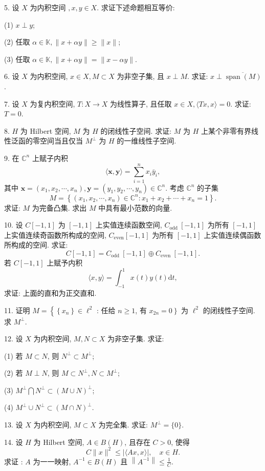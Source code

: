 \documentclass[openany]{ctexbook}
\theoremstyle{kaiti}
\theoremstyle{normal}
\begin{document}
5. 设 $X$ 为内积空间 $, x, y \in X$. 求证下述命题相互等价:

(1) $x \perp y$;

(2) 任取 $\alpha \in \mathbb{K},\|x+\alpha y\| \geqslant\|x\|$;

(3) 任取 $\alpha \in \mathbb{K},\|x+\alpha y\|=\|x-\alpha y\|$.

6. 设 $X$ 为内积空间, $x \in X, M \subset X$ 为非空子集, 且 $x \perp M$. 求证: $x \perp \overline{\operatorname{span}(M)}$.

7. 设 $X$ 为复内积空间, $T: X \rightarrow X$ 为线性算子, 且任取 $x \in X,\langle T x, x\rangle=0$. 求证: $T=0$.

8. $H$ 为 Hilbert 空间, $M$ 为 $H$ 的闭线性子空间. 求证: $M$ 为 $H$ 上某个非零有界线性泛函的零空间当且仅当 $M^{\perp}$ 为 $H$ 的一维线性子空间.

9. 在 $\mathbb{C}^n$ 上赋子内积
$$
\langle\boldsymbol{x}, \boldsymbol{y}\rangle=\sum_{i=1}^n x_{i} \bar{y}_{i},
$$
其中 $\boldsymbol{x}=\left(x_1, x_2, \cdots, x_n\right), \boldsymbol{y}=\left(y_1, y_2, \cdots, y_n\right) \in \mathbb{C}^n$. 考虑 $\mathbb{C}^n$ 的子集
$$
M=\left\{\left(x_1, x_2, \cdots, x_n\right) \in \mathbb{C}^n: x_1+x_2+\cdots+x_n=1\right\}.
$$
求证: $M$ 为完备凸集. 求出 $M$ 中具有最小范数的向量.

10. 设 $C[-1,1]$ 为 $[-1,1]$ 上实值连续函数空间, $C_{\text {odd }}[-1,1]$ 为所有 $[-1,1]$ 上实值连续奇函数所构成的空间, $C_{\mathrm{even}}[-1,1]$ 为所有 $[-1,1]$ 上实值连续偶函数所构成的空间. 求证:
$$
C[-1,1]=C_{\text {odd }}[-1,1] \oplus C_{\text {even }}[-1,1].
$$
若 $C[-1,1]$ 上赋予内积
$$
\langle x, y\rangle=\int_{-1}^1 x(t) y(t) \mathrm{d} t,
$$
求证: 上面的直和为正交直和.

11. 证明 $M=\left\{\left\{x_n\right\} \in \ell^2\right.$ : 任给 $n \geqslant 1$, 有 $\left.x_{2 n}=0\right\}$ 为 $\ell^2$ 的闭线性子空间. 求 $M^{\perp}$.

12. 设 $X$ 为内积空间, $M, N \subset X$ 为非空子集. 求证:

(1) 若 $M \subset N$, 则 $N^{\perp} \subset M^{\perp}$;

(2) 若 $M \perp N$, 则 $M \subset N^{\perp}, N \subset M^{\perp}$;

(3) $M^{\perp} \bigcap N^{\perp} \subset(M \cup N)^{\perp}$;

(4) $M^{\perp} \cup N^{\perp} \subset(M \cap N)^{\perp}$.

13. 设 $X$ 为内积空间, $M \subset X$ 为完全集. 求证: $M^{\perp}=\{0\}$.

14. 设 $H$ 为 Hilbert 空间, $A \in B(H)$, 且存在 $C>0$, 使得
$$
C\|x\|^2 \leqslant|\langle A x, x\rangle|, \quad x \in H.
$$
求证 : $A$ 为一一映射, $A^{-1} \in B(H)$ 且 $\left\|A^{-1}\right\| \leqslant \frac{1}{C}$.
\end{document}
